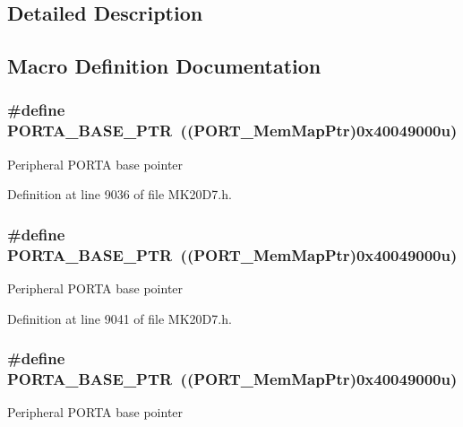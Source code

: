 \subsection{Detailed Description}


\subsection{Macro Definition Documentation}
\subsubsection[{\texorpdfstring{P\+O\+R\+T\+A\+\_\+\+B\+A\+S\+E\+\_\+\+P\+TR}{PORTA_BASE_PTR}}]{\setlength{\rightskip}{0pt plus 5cm}\#define P\+O\+R\+T\+A\+\_\+\+B\+A\+S\+E\+\_\+\+P\+TR~(({\bf P\+O\+R\+T\+\_\+\+Mem\+Map\+Ptr})0x40049000u)}\hypertarget{group___p_o_r_t___peripheral_gaa18ec7594fe603225220ec6eda4a19ce}{}\label{group___p_o_r_t___peripheral_gaa18ec7594fe603225220ec6eda4a19ce}
Peripheral P\+O\+R\+TA base pointer 

Definition at line 9036 of file M\+K20\+D7.\+h.

\subsubsection[{\texorpdfstring{P\+O\+R\+T\+A\+\_\+\+B\+A\+S\+E\+\_\+\+P\+TR}{PORTA_BASE_PTR}}]{\setlength{\rightskip}{0pt plus 5cm}\#define P\+O\+R\+T\+A\+\_\+\+B\+A\+S\+E\+\_\+\+P\+TR~(({\bf P\+O\+R\+T\+\_\+\+Mem\+Map\+Ptr})0x40049000u)}\hypertarget{group___p_o_r_t___peripheral_gaa18ec7594fe603225220ec6eda4a19ce}{}\label{group___p_o_r_t___peripheral_gaa18ec7594fe603225220ec6eda4a19ce}
Peripheral P\+O\+R\+TA base pointer 

Definition at line 9041 of file M\+K20\+D7.\+h.

\subsubsection[{\texorpdfstring{P\+O\+R\+T\+A\+\_\+\+B\+A\+S\+E\+\_\+\+P\+TR}{PORTA_BASE_PTR}}]{\setlength{\rightskip}{0pt plus 5cm}\#define P\+O\+R\+T\+A\+\_\+\+B\+A\+S\+E\+\_\+\+P\+TR~(({\bf P\+O\+R\+T\+\_\+\+Mem\+Map\+Ptr})0x40049000u)}\hypertarget{group___p_o_r_t___peripheral_gaa18ec7594fe603225220ec6eda4a19ce}{}\label{group___p_o_r_t___peripheral_gaa18ec7594fe603225220ec6eda4a19ce}
Peripheral P\+O\+R\+TA base pointer 

